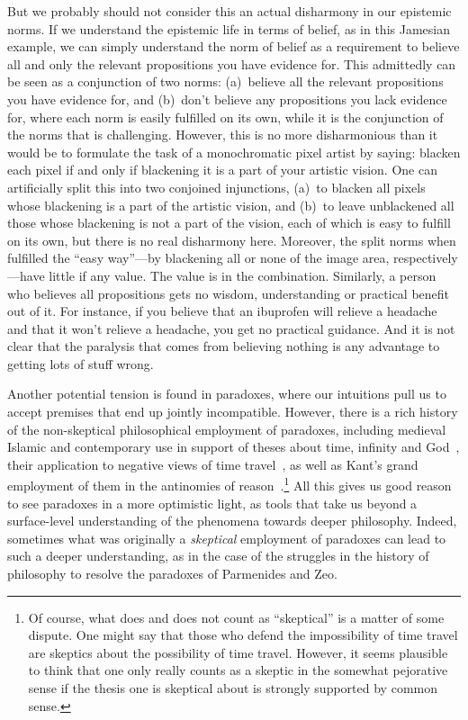 But we probably should not consider this an actual disharmony in our epistemic norms. If we understand the epistemic
life in terms of belief, as in this Jamesian example, we can simply understand the norm of belief as a requirement to believe 
all and only the relevant propositions you have evidence for. This admittedly can be seen as a conjunction of 
two norms: (a)~believe all the relevant propositions you have evidence for, and (b)~don't believe any propositions 
you lack evidence for, where each norm is easily fulfilled on its own, while it is the conjunction of the norms that 
is challenging. However, this is no more disharmonious than it would be to formulate the task of a monochromatic pixel
artist by saying: blacken each pixel if and only if blackening it is a part of your artistic vision. One can artificially
split this into two conjoined injunctions, (a)~to blacken all pixels whose blackening is a part of the artistic vision, and (b)~to 
leave unblackened all those whose blackening is not a part of the vision, each of which is easy to fulfill on its own, but there
is no real disharmony here. Moreover, the split norms when fulfilled the ``easy way''---by blackening all or none of the 
image area, respectively---have little if any value. The value is in the combination. Similarly, a person who believes 
all propositions gets no wisdom, understanding or practical benefit out of it. For instance, if you believe that an ibuprofen 
will relieve a headache and that it won't relieve a headache, you get no practical guidance. And it is not clear that 
the paralysis that comes from believing nothing is any advantage to getting lots of stuff wrong.

Another potential tension is found in paradoxes, where our intuitions pull us to accept premises that end up jointly 
incompatible. However, there is a rich history of the non-skeptical philosophical employment of paradoxes,
including medieval Islamic and contemporary use in support of theses about time, infinity and 
God~\parencite{KoonsKalaam,CopanCraig2017,PrussInfinity}, their application to negative views of time 
travel~\parencite{SmithTimeTravel}, as well as Kant's grand employment of them in the antinomies 
of reason~.\footnote{Of course, what does and does not count as ``skeptical'' is a matter of
some dispute. One might say that those who defend the impossibility of time travel are skeptics about 
the possibility of time travel. However, it seems plausible to think that one only really counts as a skeptic 
in the somewhat pejorative sense if the thesis one is skeptical about is strongly supported by common sense.}
 All this gives us good reason to see paradoxes in a more optimistic light, as 
tools that take us beyond a surface-level understanding of the phenomena towards deeper philosophy. Indeed,
sometimes what was originally a \textit{skeptical} employment of paradoxes can lead to such a deeper understanding, 
as in the case of the struggles in the history of philosophy to resolve the paradoxes of Parmenides and Zeo.


